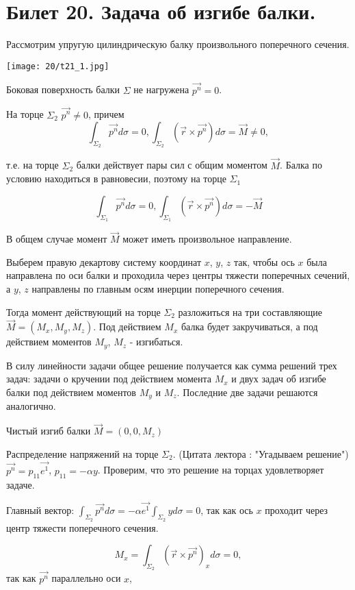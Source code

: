 \newpage
\section{Билет 20. Задача об изгибе балки.}

Рассмотрим упругую цилиндрическую балку произвольного поперечного сечения.

\texttt{[image: 20/t21\_1.jpg]}


\noindent Боковая поверхность балки $\Sigma$ не нагружена $\vec{p^n} = 0$.

\noindent На торце $\Sigma_2$ $\vec{p^n} \neq 0$, причем
$$\int_{\Sigma_2} {\vec{p^n} d{\sigma}} = 0,
  \int_{\Sigma_2} (\vec{r} \times \vec{p^n}) d{\sigma} = \vec{M} \neq 0,$$

\noindent т.е. на торце $\Sigma_2$ балки действует пары сил с общим моментом $\vec{M}$. Балка по условию находиться в равновесии, поэтому на торце $\Sigma_1$

$$\int_{\Sigma_1} {\vec{p^n} d{\sigma}} = 0,
  \int_{\Sigma_1} (\vec{r} \times \vec{p^n}) d{\sigma} = -\vec{M}$$

\noindent В общем случае момент $\vec{M}$ может иметь произвольное направление.

Выберем правую декартову систему координат $x$, $y$, $z$ так, чтобы ось $x$ была направлена по оси балки и проходила через центры тяжести поперечных сечений, а $y$, $z$ направлены по главным осям инерции поперечного сечения.

\noindent Тогда момент действующий на торце $\Sigma_2$ разложиться на три составляющие $\vec{M} = (M_x,M_y,M_z)$. Под действием $M_x$ балка будет закручиваться, а под действием моментов $M_y$, $M_z$ - изгибаться.

В силу линейности задачи общее решение получается как сумма решений трех задач: задачи о кручении под действием момента $M_x$ и двух задач об изгибе балки под действием моментов $M_y$ и $M_z$. Последние две задачи решаются аналогично.

Чистый изгиб балки $\vec{M} = (0,0,M_z)$


Распределение напряжений на торце $\Sigma_2$.
(Цитата лектора : "Угадываем решение") $\vec{p^n} = p_{11}\vec{e^1}$, $p_{11} = - \alpha y$. Проверим, что это решение на торцах удовлетворяет задаче.

Главный вектор: $ \int_{\Sigma_2} {\vec{p^n} d{\sigma}} = -\alpha \vec{e^1} \int_{\Sigma_2} {y d{\sigma}} = 0$, так как ось $x$ проходит через центр тяжести поперечного сечения.

$$ M_x = \int_{\Sigma_2} {(\vec{r} \times \vec{p^n})_x d{\sigma}} = 0,$$
\noindent так как $\vec{p^n}$ параллельно оси $x$,

